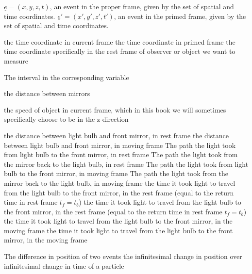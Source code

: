 {$\underline{e}=(x,y,z,t)$, an event in the proper frame, given by the set of spatial and time coordinates.}
{$\underline{e}'=(x',y',z',t')$, an event in the primed frame, given by the set of spatial and time coordinates.}

{the time coordinate in current frame}
{the time coordinate in primed frame}
\variableterm{\Ttau}{\tau} %
{the time coordinate specifically in the rest frame of observer or object we want to measure}


\variableterm{\TDelta}{\Delta}
{The interval in the corresponding variable}


{the distance between mirrors}


{the speed of object in current frame, which in this book we will sometimes specifically choose to be in the z-direction}


{the distance between light bulb and front mirror, in rest frame}
{the distance between light bulb and front mirror, in moving frame}
{The path the light took from light bulb to the front mirror, in rest frame}
{The path the light took from the mirror back to the light bulb, in rest frame}
{The path the light took from light bulb to the front mirror, in moving frame}
{The path the light took from the mirror back to the light bulb, in moving frame}
{the time it took light to travel from the light bulb to the front mirror, in the rest frame (equal to the return time in rest frame $t_f=t_b$)}
{the time it took light to travel from the light bulb to the front mirror, in the rest frame (equal to the return time in rest frame $t_f=t_b$)}
{the time it took light to travel from the light bulb to the front mirror, in the moving frame}
{the time it took light to travel from the light bulb to the front mirror, in the moving frame}




{The difference in position of two events}
{the infinitesimal change in position over infinitesimal change in time of a particle}

